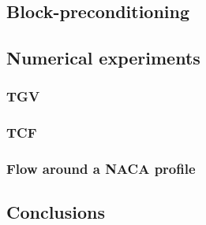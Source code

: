 \documentclass[compress,11 pt,t]{beamer}
\begin{document}
\subsection{Block-preconditioning}


\subsection{Numerical experiments}


\subsubsection{TGV}


\subsubsection{TCF}

\subsubsection{Flow around a NACA profile}

\subsection{Conclusions}

\end{document}
